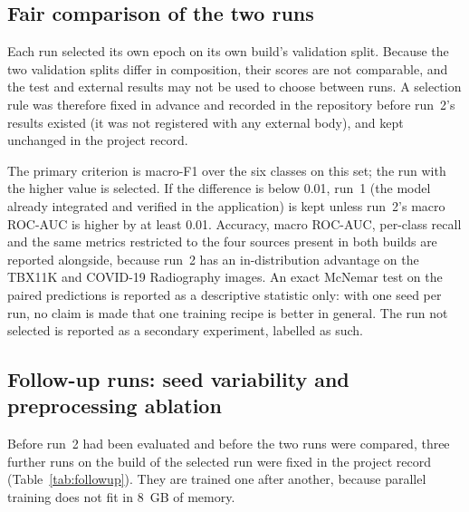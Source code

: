 \subsection{Fair comparison of the two runs}
\label{sec:selection}
Each run selected its own epoch on its own build's validation split. Because the two validation splits differ in composition, their scores are not comparable, and the test and external results may not be used to choose between runs. A selection rule was therefore fixed in advance and recorded in the repository before run~2's results existed (it was not registered with any external body), and kept unchanged in the project record.

The primary criterion is macro-F1 over the six classes on this set; the run with the higher value is selected. If the difference is below 0.01, run~1 (the model already integrated and verified in the application) is kept unless run~2's macro ROC-AUC is higher by at least 0.01. Accuracy, macro ROC-AUC, per-class recall and the same metrics restricted to the four sources present in both builds are reported alongside, because run~2 has an in-distribution advantage on the TBX11K and COVID-19 Radiography images. An exact McNemar test on the paired predictions is reported as a descriptive statistic only: with one seed per run, no claim is made that one training recipe is better in general. The run not selected is reported as a secondary experiment, labelled as such.

\subsection{Follow-up runs: seed variability and preprocessing ablation}
\label{sec:followup}
Before run~2 had been evaluated and before the two runs were compared, three further runs on the build of the selected run were fixed in the project record (Table~\ref{tab:followup}). They are trained one after another, because parallel training does not fit in 8~GB of memory.


